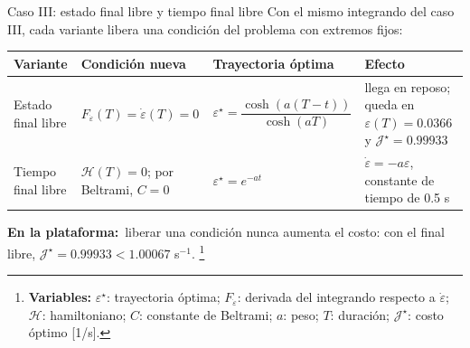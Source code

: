\documentclass[aspectratio=169,10pt]{beamer}
\newcommand{\variables}[1]{\begingroup\renewcommand{\thefootnote}{}\footnote[frame]{\textbf{Variables:} #1}\addtocounter{footnote}{-1}\endgroup}
\newcommand{\valores}{{\color{acento}\textbf{En la plataforma:}}\ }
\begin{document}
\begin{frame}{Caso III: estado final libre y tiempo final libre}
\small
Con el mismo integrando del caso III, cada variante libera una condición del problema con extremos fijos:
\begin{center}
\footnotesize
\renewcommand{\arraystretch}{1.5}
\begin{tabular}{@{}L{2.4cm}L{3.3cm}L{3.4cm}L{3.6cm}@{}}
\toprule
Variante & Condición nueva & Trayectoria óptima & Efecto \\
\midrule
Estado final libre & $F_{\dot\varepsilon}(T) = \dot\varepsilon(T) = 0$ & $\varepsilon^\star = \dfrac{\cosh(a(T - t))}{\cosh(aT)}$ & llega en reposo; queda en $\varepsilon(T) = 0.0366$ y $\mathcal J^\star = 0.99933$ \\
Tiempo final libre & $\mathcal H(T) = 0$; por Beltrami, $C = 0$ & $\varepsilon^\star = e^{-at}$ & $\dot\varepsilon = -a\varepsilon$, constante de tiempo de 0.5 s \\
\bottomrule
\end{tabular}
\end{center}
\valores liberar una condición nunca aumenta el costo: con el final libre, $\mathcal J^\star = 0.99933 < 1.00067$ s$^{-1}$.
\variables{$\varepsilon^\star$: trayectoria óptima; $F_{\dot\varepsilon}$: derivada del integrando respecto a $\dot\varepsilon$; $\mathcal H$: hamiltoniano; $C$: constante de Beltrami; $a$: peso; $T$: duración; $\mathcal J^\star$: costo óptimo [1/s].}
\end{frame}
\end{document}
